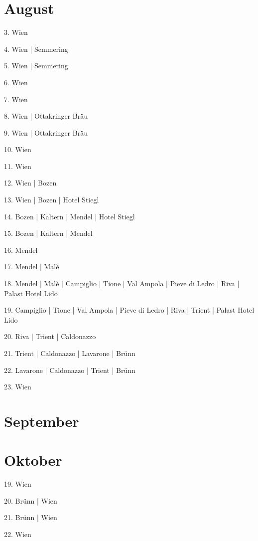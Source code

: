 \documentclass[twoside=false,titlepage=false,open=any, parskip=never, fontsize=10pt, headings=small, chapterprefix=false, appendixprefix=false, DIV=15]{scrbook}
\begin{document}
\begin{multicols}{3}
            \section*{August}
            3. Wien\par
            4. Wien | Semmering\par
            5. Wien | Semmering\par
            6. Wien\par
            7. Wien\par
            8. Wien | Ottakringer Bräu\par
            9. Wien | Ottakringer Bräu\par
            10. Wien\par
            11. Wien\par
            12. Wien | Bozen\par
            13. Wien | Bozen | Hotel Stiegl\par
            14. Bozen | Kaltern | Mendel | Hotel Stiegl\par
            15. Bozen | Kaltern | Mendel\par
            16. Mendel\par
            17. Mendel | Malè\par
            18. Mendel | Malè | Campiglio | Tione | Val Ampola | Pieve di Ledro | Riva | Palast Hotel Lido\par
            19. Campiglio | Tione | Val Ampola | Pieve di Ledro | Riva | Trient | Palast Hotel Lido\par
            20. Riva | Trient | Caldonazzo\par
            21. Trient | Caldonazzo | Lavarone | Brünn\par
            22. Lavarone | Caldonazzo | Trient | Brünn\par
            23. Wien\par
            \section*{September}
            \section*{Oktober}
            19. Wien\par
            20. Brünn | Wien\par
            21. Brünn | Wien\par
            22. Wien\par

\end{multicols}
\end{document}
